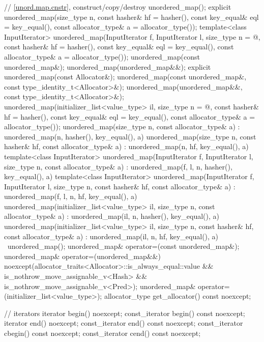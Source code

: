 \begin{codeblock}
{{    // \ref{unord.map.cnstr}, construct/copy/destroy
    unordered_map();
    explicit unordered_map(size_type n,
                           const hasher& hf = hasher(),
                           const key_equal& eql = key_equal(),
                           const allocator_type& a = allocator_type());
    template<class InputIterator>
      unordered_map(InputIterator f, InputIterator l,
                    size_type n = @\seebelow@,
                    const hasher& hf = hasher(),
                    const key_equal& eql = key_equal(),
                    const allocator_type& a = allocator_type());
    unordered_map(const unordered_map&);
    unordered_map(unordered_map&&);
    explicit unordered_map(const Allocator&);
    unordered_map(const unordered_map&, const type_identity_t<Allocator>&);
    unordered_map(unordered_map&&, const type_identity_t<Allocator>&);
    unordered_map(initializer_list<value_type> il,
                  size_type n = @\seebelow@,
                  const hasher& hf = hasher(),
                  const key_equal& eql = key_equal(),
                  const allocator_type& a = allocator_type());
    unordered_map(size_type n, const allocator_type& a)
      : unordered_map(n, hasher(), key_equal(), a) { }
    unordered_map(size_type n, const hasher& hf, const allocator_type& a)
      : unordered_map(n, hf, key_equal(), a) { }
    template<class InputIterator>
      unordered_map(InputIterator f, InputIterator l, size_type n, const allocator_type& a)
        : unordered_map(f, l, n, hasher(), key_equal(), a) { }
    template<class InputIterator>
      unordered_map(InputIterator f, InputIterator l, size_type n, const hasher& hf,
                    const allocator_type& a)
        : unordered_map(f, l, n, hf, key_equal(), a) { }
    unordered_map(initializer_list<value_type> il, size_type n, const allocator_type& a)
      : unordered_map(il, n, hasher(), key_equal(), a) { }
    unordered_map(initializer_list<value_type> il, size_type n, const hasher& hf,
                  const allocator_type& a)
      : unordered_map(il, n, hf, key_equal(), a) { }
    ~unordered_map();
    unordered_map& operator=(const unordered_map&);
    unordered_map& operator=(unordered_map&&)
      noexcept(allocator_traits<Allocator>::is_always_equal::value &&
               is_nothrow_move_assignable_v<Hash> &&
               is_nothrow_move_assignable_v<Pred>);
    unordered_map& operator=(initializer_list<value_type>);
    allocator_type get_allocator() const noexcept;

    // iterators
    iterator       begin() noexcept;
    const_iterator begin() const noexcept;
    iterator       end() noexcept;
    const_iterator end() const noexcept;
    const_iterator cbegin() const noexcept;
    const_iterator cend() const noexcept;

}}
\end{codeblock}
